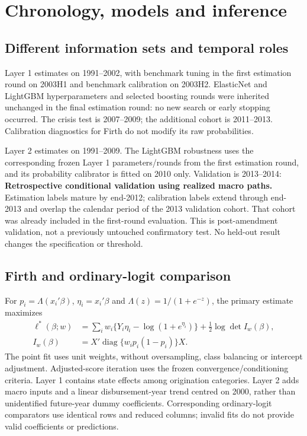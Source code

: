 \section{Chronology, models and inference}
\subsection{Different information sets and temporal roles}
Layer 1 estimates on 1991--2002, with benchmark tuning in the first estimation round on 2003H1 and benchmark calibration on 2003H2. ElasticNet and LightGBM hyperparameters and selected boosting rounds were inherited unchanged in the final estimation round: no new search or early stopping occurred. The crisis test is 2007--2009; the additional cohort is 2011--2013. Calibration diagnostics for Firth do not modify its raw probabilities.

Layer 2 estimates on 1991--2009. The LightGBM robustness uses the corresponding frozen Layer 1 parameters/rounds from the first estimation round, and its probability calibrator is fitted on 2010 only. Validation is 2013--2014: \textbf{Retrospective conditional validation using realized macro paths.} Estimation labels mature by end-2012; calibration labels extend through end-2013 and overlap the calendar period of the 2013 validation cohort. That cohort was already included in the first-round evaluation. This is post-amendment validation, not a previously untouched confirmatory test. No held-out result changes the specification or threshold.

\subsection{Firth and ordinary-logit comparison}
For $p_i=\Lambda(x_i'\beta)$, $\eta_i=x_i'\beta$ and $\Lambda(z)=1/(1+e^{-z})$, the primary estimate maximizes
\begin{align*}
\ell^*(\beta;w)&=\sum_iw_i\{Y_i\eta_i-\log(1+e^{\eta_i})\}+\tfrac12\log\det I_w(\beta),\\
I_w(\beta)&=X'\operatorname{diag}\{w_ip_i(1-p_i)\}X.
\end{align*}
The point fit uses unit weights, without oversampling, class balancing or intercept adjustment. Adjusted-score iteration uses the frozen convergence/conditioning criteria. Layer 1 contains state effects among origination categories. Layer 2 adds macro inputs and a linear disbursement-year trend centred on 2000, rather than unidentified future-year dummy coefficients. Corresponding ordinary-logit comparators use identical rows and reduced columns; invalid fits do not provide valid coefficients or predictions.

